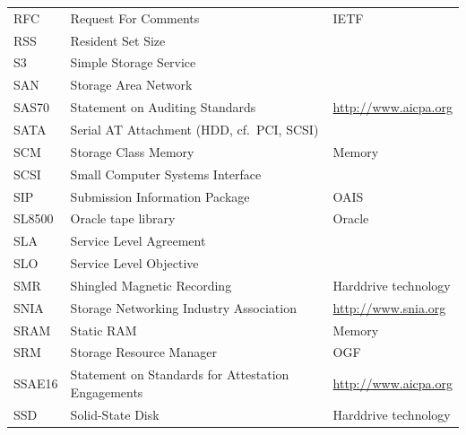 \documentclass{../../template/esiwace-report}
\begin{document}
\begin{longtable}{|l|l|l|}
  RFC		&	Request For Comments				&	IETF				\\
  RSS         &         Resident Set Size                             &                                       \\
  S3          &       Simple Storage Service                          &                                       \\
  SAN         &         Storage Area Network                          &                                       \\
  SAS70       &         Statement on Auditing Standards               &         \url{http://www.aicpa.org}                 \\
  SATA        &         Serial AT Attachment (HDD, cf.~PCI, SCSI)     &                                       \\
  SCM         &         Storage Class Memory                          &         Memory                        \\
  SCSI		&	Small Computer Systems Interface		&					\\
  SIP         &       Submission Information Package                  &       OAIS                            \\
  SL8500      &       Oracle tape library                             &       Oracle                          \\
  SLA         &       Service Level Agreement                         &                                       \\
  SLO         &       Service Level Objective                         &                                       \\
  SMR         &         Shingled Magnetic Recording                   &         Harddrive technology          \\
  SNIA        &       Storage Networking Industry Association         &       \url{http://www.snia.org}                    \\
  SRAM        &         Static RAM                                    &         Memory                        \\
  SRM         &         Storage Resource Manager                      &         OGF                           \\
  SSAE16      &         Statement on Standards for Attestation Engagements & \url{http://www.aicpa.org}                    \\
  SSD         &         Solid-State Disk                              &         Harddrive technology          \\

\end{longtable}
\end{document}
